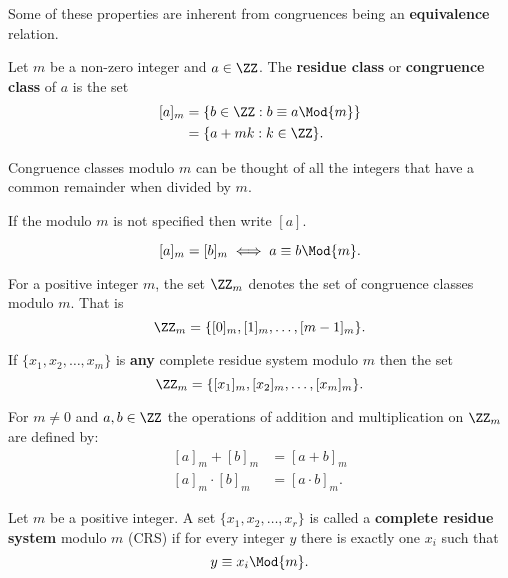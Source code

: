 \documentclass[12pt, a4paper]{article}
\begin{document}
\begin{mdnote}
    Some of these properties are inherent from congruences being an \textbf{equivalence} relation.
\end{mdnote}

\begin{definition}
    Let \(m\) be a non-zero integer and \(a \in \ZZ\). The \textbf{residue class} or \textbf{congruence class} of \(a\) is the set 
    \[\begin{aligned}
        [a]_m &= \{b \in \ZZ : b \equiv a \Mod{m}\} \\
            &= \{a+mk : k \in \ZZ\}.
    \end{aligned}\]
\end{definition}

\begin{mdremark}
    Congruence classes modulo \(m\) can be thought of all the integers that have a common remainder when divided by \(m\).
\end{mdremark}

\begin{mdnote}
    If the modulo \(m\) is not specified then write \([a]\).
\end{mdnote}

\begin{lemma}
    \[[a]_m=[b]_m \iff a\equiv b\Mod{m}.\]
\end{lemma}

\begin{definition}
    For a positive integer \(m\), the set \(\ZZ_m\) denotes the set of congruence classes modulo \(m\). That is 
    \[\ZZ_m =\{[0]_m,[1]_m,\ldots,[m-1]_m\}.\]
\end{definition}

\begin{mdremark}
    If \(\{x_1,x_2,\dots,x_m\}\) is \textbf{any} complete residue system modulo \(m\) then the set \[\ZZ_m = \{[x_1]_m,[x_2]_m,\ldots, [x_m]_m\}.\]
\end{mdremark}

\begin{definition}
    For \(m\neq 0\) and \(a,b \in \ZZ\) the operations of addition and multiplication on \(\ZZ_m\) are defined by:
    \[\begin{aligned}
        [a]_m+[b]_m&=[a+b]_m \\
        [a]_m\cdot [b]_m &= [a\cdot b]_m.
    \end{aligned}\]
\end{definition}

\begin{definition}
    Let \(m\) be a positive integer. A set \(\{x_1,x_2,\ldots,x_r\}\) is called a \textbf{complete residue system} modulo \(m\) (CRS) if for every integer \(y\) there is exactly one \(x_i\) such that
    \[y \equiv x_i\Mod{m}.\]
\end{definition}
\end{document}
